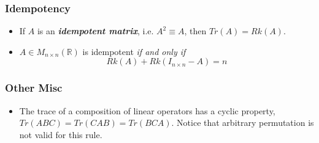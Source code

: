 \documentclass[10pt]{article}
\newcommand{\R}{\mathbb{R}}
\newcommand{\mat}[2]{M_{#1 \times #2}(\R)}
\begin{document}
\subsubsection{Idempotency}
\begin{itemize}
    \item If $A$ is an \textit{\textbf{idempotent matrix}}, i.e. $A^2 \equiv A$, then $Tr(A) = Rk(A)$.
    \item $A\in \mat{n}{n}$ is idempotent \textit{if and only if} 
        \begin{equation*}
            Rk(A) + Rk(I_{n \times n} - A) = n
        \end{equation*}
\end{itemize}
\subsubsection{Other Misc}
\begin{itemize}
    \item The trace of a composition of linear operators has a cyclic property, $Tr(ABC) = Tr(CAB) = Tr(BCA)$. Notice that arbitrary permutation is not valid for this rule. 
\end{itemize}
\end{document}
